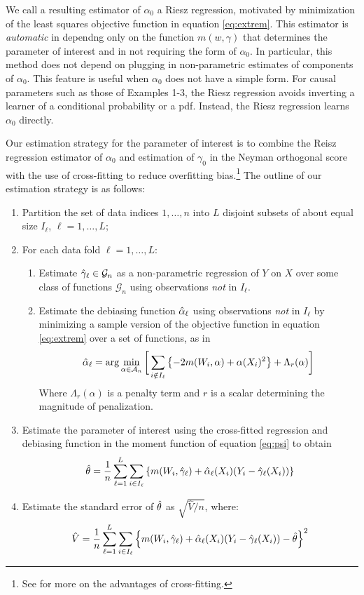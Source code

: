 \documentclass[aos]{imsart}
\numberwithin{equation}{section}
\theoremstyle{plain}
\theoremstyle{remark}
\newcommand{\gh}{\Hat{\gamma}}
\newcommand{\ah}{\Hat{\alpha}}
\newcommand{\Vh}{\Hat{V}}
\renewcommand{\th}{\Hat{\theta}}
\begin{document}
We call a resulting  estimator of $\alpha_0$ a Riesz regression, motivated by minimization of the least squares objective function in equation \eqref{eq:extrem}. 
This estimator is \textit{automatic} in dependng only on the function $m(w,\gamma)$ that determines the parameter of interest and in not requiring the form of $\alpha_{0}$. 
In particular, this method does not depend on plugging in non-parametric estimates of components of $\alpha_{0}$. 
This feature is useful when $\alpha_0$ does not have a simple form. 
For causal parameters such as those of Examples 1-3, the Riesz regression avoids inverting a learner of a conditional probability or a pdf.  
Instead, the Riesz regression learns $\alpha_{0}$ directly. 

Our estimation strategy for the parameter of interest is to combine the Reisz regression estimator of $\alpha_0$ and estimation of $\gamma_0$ in the Neyman orthogonal score with the use of cross-fitting to reduce overfitting bias.\footnote{See \cite{newey2018cross} for more on the advantages of cross-fitting.} 
The outline of our estimation strategy is as follows:

\begin{enumerate}
    \item Partition the set of data indices ${1, \ldots, n}$ into $L$ disjoint subsets of about equal size $I_\ell$, $\ell = 1, \ldots, L$;
    \item For each data fold $\ell = 1, \ldots, L$:
    \begin{enumerate}
        \item Estimate $\gh_\ell \in \mathcal{G}_n$ as a non-parametric regression of $Y$ on $X$ over some class of functions $\mathcal{G}_n$ using observations \textit{not} in $I_\ell$.
        \item Estimate the debiasing function $\ah_\ell$ using observations \textit{not} in $I_\ell$ by minimizing a sample version of the objective function in equation \eqref{eq:extrem} over a set of functions, as in
\[\ah_\ell = \arg\min_{\alpha \in \mathcal{A}_n} 
\bigg[
\sum_{i \notin I_\ell}
\left\lbrace
- 2m(W_i, \alpha) +
\alpha(X_i)^2
\right\rbrace
+ \Lambda_r(\alpha)
\bigg]
\]
Where $\Lambda_r(\alpha)$ is a penalty term and $r$ is a scalar determining the magnitude of penalization.
    \end{enumerate}
    \item Estimate the parameter of interest using the cross-fitted regression and debiasing function in the moment function of equation \eqref{eq:psi} to obtain
\[\th = \frac{1}{n}\sum_{\ell = 1}^L \sum_{i \in I_\ell} \left\lbrace m(W_i, \gh_\ell) + \ah_\ell(X_i) (Y_i - \gh_\ell(X_i))\right\rbrace\]
    \item Estimate the standard error of $\th$ as $\sqrt{\hat{V}/ n}$, where:
\[\Vh = \frac{1}{n}\sum_{\ell = 1}^L \sum_{i \in I_\ell} \left\lbrace m(W_i, \gh_\ell) + \ah_\ell(X_i) (Y_i - \gh_\ell(X_i)) - \th\right\rbrace^2 \]
\end{enumerate}
\end{document}
